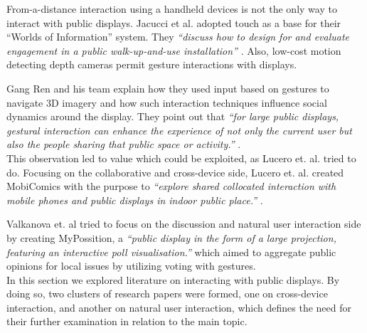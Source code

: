 
From-a-distance interaction using a handheld devices is not the only way to interact with public displays. 
Jacucci et al. adopted touch as a base for their ``Worlds of Information'' system.  %
They \emph{``discuss how to design for and evaluate engagement in a public walk-up-and-use installation''} \cite{Jacucci:2010}. %
Also, low-cost motion detecting depth cameras permit gesture interactions with displays. 


Gang Ren and his team explain how they used input based on gestures to navigate 3D imagery and how such interaction techniques influence social dynamics around the display. 
They point out that\emph{ ``for large public displays, gestural interaction can enhance the experience of not only the current user but also the people sharing that public space or activity.''} \cite{Ren:2013}.\\

This observation led to value which could be exploited, as Lucero et. al. tried to do. 
Focusing on the collaborative and cross-device side, Lucero et. al. created MobiComics with the purpose to \emph{``explore shared collocated interaction with mobile phones and public displays in indoor public place.''} \cite{Lucero:2012}. 

Valkanova et. al tried to focus on the discussion and natural user interaction side by creating MyPossition, a \emph{``public display in the form of a large projection, featuring an interactive poll visualisation.''} \cite{Valkanova:2014} which aimed to aggregate public opinions for local issues by utilizing voting with gestures.\\

In this section we explored literature on interacting with public displays. 
By doing so, two clusters of research papers were formed, one on cross-device interaction, and another on natural user interaction, which defines the need for their further examination in relation to the main topic.

